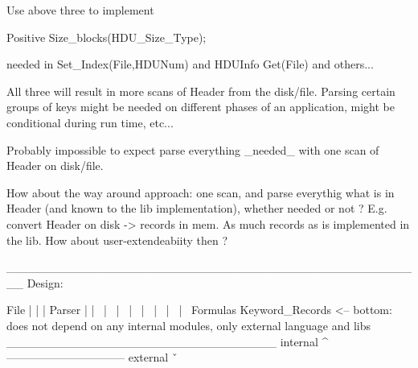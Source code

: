 Use above three to implement

 Positive Size_blocks(HDU_Size_Type);

needed in Set_Index(File,HDUNum) and
HDUInfo Get(File) and others...

All three will result in more scans of Header from the disk/file.
Parsing certain groups of keys might be needed on different
phases of an application, might be conditional during run time, etc...

Probably impossible to expect parse everything _needed_ with one scan
of Header on disk/file.

How about the way around approach: 
one scan, and parse everythig what is in Header (and known to 
the lib implementation), whether needed or not ?
E.g. convert Header on disk -> records in mem. As much records 
as is implemented in the lib. How about user-extendeabiity then ?

__________________________________________________
Design:

File
|
|
|
Parser
|
| \
|  \
|   \
|    \
|     \
|      \
|       \
|        \
Formulas  Keyword_Records  <-- bottom: does not depend on any internal modules, only external language and libs
________________________________ internal ^
-------------------------------- external ˇ


